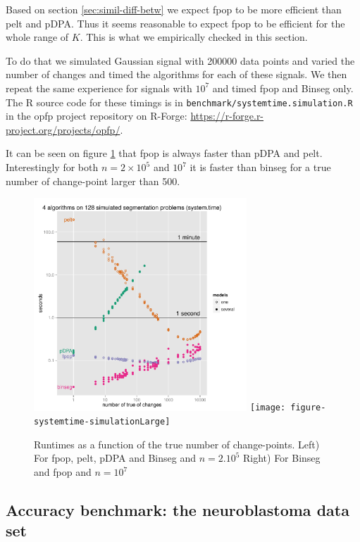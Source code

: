 \documentclass{article}
\begin{document}
Based on section \ref{sec:simil-diff-betw} we expect fpop to be more efficient than pelt and pDPA.
Thus it seems reasonable to expect fpop to be efficient for the whole range of $K$. 
This is what we empirically checked in this section.

To do that we simulated Gaussian signal with 200000 data points and varied the number of changes
and timed the algorithms for each of these signals. We then repeat the same experience for signals with $10^7$ and timed fpop and Binseg only.
The R source code
for these timings is in \verb|benchmark/systemtime.simulation.R| in
the opfp project repository on R-Forge: \url{https://r-forge.r-project.org/projects/opfp/}.

It can be seen on figure \ref{fig:simu_numberK} that fpop is always faster than pDPA and pelt. 
Interestingly for both $n=2\times 10^5$ and $10^7$ it is faster than binseg for a true number of change-point larger than 500.


\begin{figure}\label{fig:simu_numberK}
  \begin{center}
      \includegraphics[width=8cm]{figure-systemtime-simulation}
    \texttt{[image: figure-systemtime-simulationLarge]}
  \end{center}
\caption{Runtimes as a function of the true number of change-points.
Left) For fpop, pelt,
pDPA and Binseg and $n=2. 10^5$
Right) For Binseg and fpop and $n=10^7$
}
\end{figure}



\subsection{Accuracy benchmark: the neuroblastoma data set}
\end{document}
